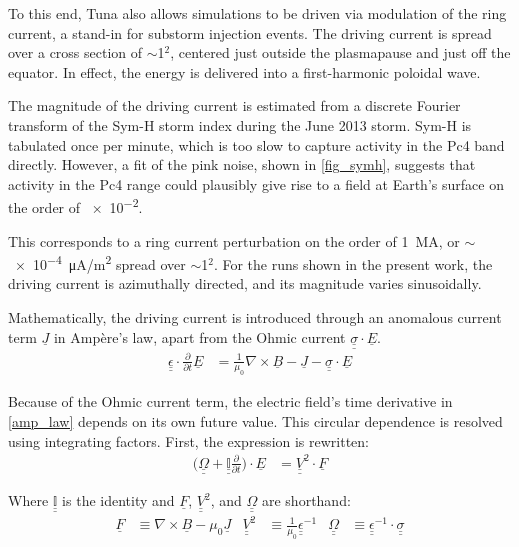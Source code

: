 \documentclass{article}
\newcommand{\about}{\ensuremath{\sim}}
\newcommand{\Ampere}{Amp\`ere\xspace}
\renewcommand{\vec}[1]{\ensuremath{\underline{#1}}}
\newcommand{\tensor}[1]{\ensuremath{\underline{\underline{#1}}}}
\newcommand{\dd}[1]{\ensuremath{ \frac{\partial}{\partial #1} }\xspace}
\newcommand{\ddt}{\dd{t}\xspace}
\newcommand{\curl}[1]{\ensuremath{ \nabla \times \vec{#1} }\xspace}
\newcommand{\mz}{\ensuremath{\mu_0}\xspace}
\newcommand{\oomz}{\ensuremath{ \frac{1}{\mz} }\xspace}
\begin{document}
To this end, Tuna also allows simulations to be driven via modulation of the ring current, a stand-in for substorm injection events. The driving current is spread over a cross section of \about\SI{1}{\RE}$^2$, centered just outside the plasmapause and just off the equator. In effect, the energy is delivered into a first-harmonic poloidal wave.

The magnitude of the driving current is estimated from a discrete Fourier transform of the Sym-H storm index during the June 2013 storm. Sym-H is tabulated once per minute, which is too slow to capture activity in the Pc4 band directly. However, a fit of the pink noise, shown in \cref{fig_symh}, suggests that activity in the Pc4 range could plausibly give rise to a field at Earth's surface on the order of \SI{e-2}{\nT}.

This corresponds to a ring current perturbation on the order of \SI{1}{\mega\A}, or \about\SI{e-4}{\uA/\m\squared} spread over \about\SI{1}{\RE}$^2$. For the runs shown in the present work, the driving current is azimuthally directed, and its magnitude varies sinusoidally.


Mathematically, the driving current is introduced through an anomalous current term $\vec{J}$ in \Ampere's law, apart from the Ohmic current ${\tensor{\sigma} \cdot \vec{E}}$.
\begin{align}
    \label{amp_law}
    \tensor{\epsilon} \cdot \ddt \vec{E} &= \oomz \curl{B} - \vec{J}
      - \tensor{\sigma} \cdot \vec{E}
\end{align}

Because of the Ohmic current term, the electric field's time derivative in \cref{amp_law} depends on its own future value. This circular dependence is resolved using integrating factors. First, the expression is rewritten:
\begin{align}
    \label{int_fac}
    \Big( \tensor{\Omega} + \tensor{ \mathbb{I} }\ddt \Big) \cdot
        \vec{E} &= \tensor{V}^2 \cdot \vec{F}
\end{align}

Where $\tensor{ \mathbb{I} }$ is the identity and $\vec{F}$, $\tensor{V}^2$, and $\tensor{\Omega}$ are shorthand:
\begin{align}
    \vec{F} &\equiv \curl{B} - \mz \vec{J} &
    \tensor{V}^2 &\equiv \frac{1}{\mz} \tensor{\epsilon}^{-1} &
    \tensor{\Omega} &\equiv \tensor{\epsilon}^{-1} \cdot \tensor{\sigma}
\end{align}
\end{document}
